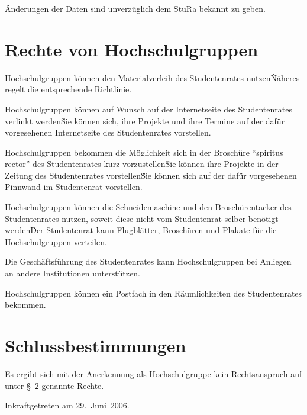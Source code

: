 \begin{multicols}{2}
\Abs \Satz Änderungen der Daten sind unverzüglich dem StuRa bekannt zu geben.


\section{Rechte von Hochschulgruppen}

\Abs \Satz Hochschulgruppen können den Materialverleih des Studentenrates nutzen\. Näheres regelt die entsprechende Richtlinie.

\Abs \Satz Hochschulgruppen können auf Wunsch auf der Internetseite des Studentenrates verlinkt werden\. Sie können sich, ihre Projekte und ihre Termine auf der dafür vorgesehenen Internetseite des Studentenrates vorstellen.

\Abs \Satz Hochschulgruppen bekommen die Möglichkeit sich in der Broschüre "`spiritus rector"' des Studentenrates kurz vorzustellen\. Sie können ihre Projekte in der Zeitung des Studentenrates vorstellen\. Sie können sich auf der dafür vorgesehenen Pinnwand im Studentenrat vorstellen.

\Abs \Satz Hochschulgruppen können die Schneidemaschine und den Broschürentacker des Studentenrates nutzen, soweit diese nicht vom Studentenrat selber benötigt werden\. Der Studentenrat kann Flugblätter, Broschüren und Plakate für die Hochschulgruppen verteilen.

\Abs \Satz Die Geschäftsführung des Studentenrates kann Hochschulgruppen bei Anliegen an andere Institutionen unterstützen.

\Abs \Satz Hochschulgruppen können ein Postfach in den Räumlichkeiten des Studentenrates bekommen.



\section{Schlussbestimmungen}
\Abs \Satz Es ergibt sich mit der Anerkennung als Hochschulgruppe kein Rechtsanspruch auf unter §~2 genannte Rechte.



\end{multicols}

\pagebreak
\vspace{1cm}
Inkraftgetreten am 29.~Juni~2006.
\\


